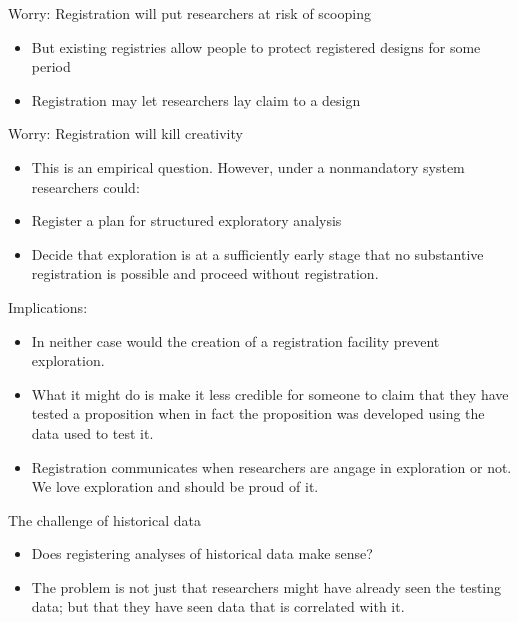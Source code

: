 \documentclass[
  11pt,
  ignorenonframetext,
]{beamer}
\providecommand{\tightlist}{%
  \setlength{\itemsep}{0pt}\setlength{\parskip}{0pt}}\usepackage{longtable,booktabs,array}
\begin{document}
\begin{frame}{Worry: Registration will put researchers at risk of
scooping}
\protect\hypertarget{worry-registration-will-put-researchers-at-risk-of-scooping}{}
\begin{itemize}
\tightlist
\item
  But existing registries allow people to protect registered designs for
  some period
\item
  Registration may let researchers lay claim to a design
\end{itemize}
\end{frame}

\begin{frame}{Worry: Registration will kill creativity}
\protect\hypertarget{worry-registration-will-kill-creativity}{}
\begin{itemize}
\tightlist
\item
  This is an empirical question. However, under a nonmandatory system
  researchers could:
\item
  Register a plan for structured exploratory analysis
\item
  Decide that exploration is at a sufficiently early stage that no
  substantive registration is possible and proceed without registration.
\end{itemize}
\end{frame}

\begin{frame}{Implications:}
\protect\hypertarget{implications}{}
\begin{itemize}
\item
  In neither case would the creation of a registration facility prevent
  exploration.
\item
  What it might do is make it less credible for someone to claim that
  they have tested a proposition when in fact the proposition was
  developed using the data used to test it.
\item
  Registration communicates when researchers are angage in exploration
  or not. We love exploration and should be proud of it.
\end{itemize}
\end{frame}

\begin{frame}{The challenge of historical data}
\protect\hypertarget{the-challenge-of-historical-data}{}
\begin{itemize}
\item
  Does registering analyses of historical data make sense?
\item
  The problem is not just that researchers might have already seen the
  testing data; but that they have seen data that is correlated with it.
\end{itemize}
\end{frame}
\end{document}
